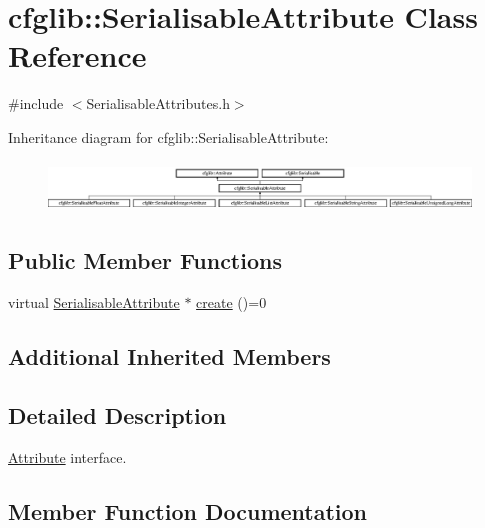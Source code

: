 \hypertarget{classcfglib_1_1SerialisableAttribute}{}\section{cfglib\+:\+:Serialisable\+Attribute Class Reference}
\label{classcfglib_1_1SerialisableAttribute}


{\ttfamily \#include $<$Serialisable\+Attributes.\+h$>$}

Inheritance diagram for cfglib\+:\+:Serialisable\+Attribute\+:\begin{figure}[H]
\begin{center}
\leavevmode
\includegraphics[height=1.344000cm]{classcfglib_1_1SerialisableAttribute}
\end{center}
\end{figure}
\subsection*{Public Member Functions}
\begin{DoxyCompactItemize}
\item 
virtual \hyperlink{classcfglib_1_1SerialisableAttribute}{Serialisable\+Attribute} $\ast$ \hyperlink{classcfglib_1_1SerialisableAttribute_a43e0793a2302b933997b9b3f5156ffff}{create} ()=0
\end{DoxyCompactItemize}
\subsection*{Additional Inherited Members}


\subsection{Detailed Description}
\hyperlink{classcfglib_1_1Attribute}{Attribute} interface. 

\subsection{Member Function Documentation}
\mbox{\label{classcfglib_1_1SerialisableAttribute_a43e0793a2302b933997b9b3f5156ffff}} 
